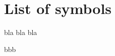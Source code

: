 \section{List of symbols}
\begin{minipage}{0.9\textwidth}
bla bla bla
\end{minipage}
\begin{minipage}{0.1\textwidth}
bbb
\end{minipage}